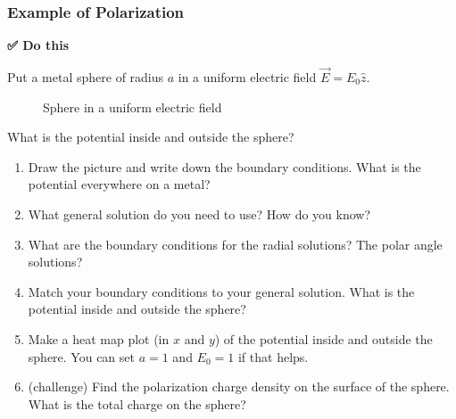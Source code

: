 \subsubsection{Example of Polarization}\label{example-of-polarization}

\textbf{✅ Do this}

Put a metal sphere of radius \(a\) in a uniform electric field
\(\vec{E} = E_0 \hat{z}\).

\begin{figure}
\centering
{}
\caption{Sphere in a uniform electric field}
\end{figure}

What is the potential inside and outside the sphere?

\begin{enumerate}
\def\labelenumi{\arabic{enumi}.}
\tightlist
\item
  Draw the picture and write down the boundary conditions. What is the
  potential everywhere on a metal?
\item
  What general solution do you need to use? How do you know?
\item
  What are the boundary conditions for the radial solutions? The polar
  angle solutions?
\item
  Match your boundary conditions to your general solution. What is the
  potential inside and outside the sphere?
\item
  Make a heat map plot (in \(x\) and \(y\)) of the potential inside and
  outside the sphere. You can set \(a=1\) and \(E_0=1\) if that helps.
\item
  (challenge) Find the polarization charge density on the surface of the
  sphere. What is the total charge on the sphere?
\end{enumerate}

\begin{Shaded}
\begin{Highlighting}[]
\end{Highlighting}
\end{Shaded}

\begin{Shaded}
\begin{Highlighting}[]

\end{Highlighting}
\end{Shaded}

